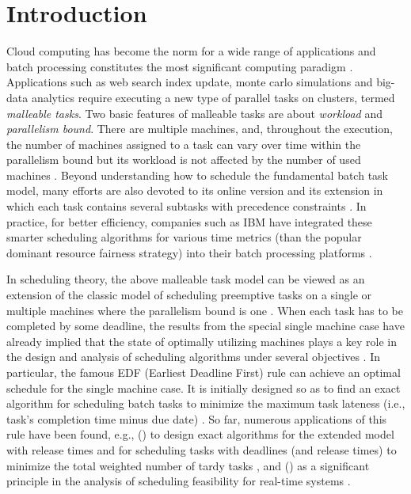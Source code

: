 \documentclass[10pt,journal,compsoc]{IEEEtran}
\newcommand{\rmnum}[1]{\romannumeral #1}
\begin{document}
\maketitle


\IEEEdisplaynontitleabstractindextext




\IEEEpeerreviewmaketitle




\section{Introduction}
\label{intro}


Cloud computing has become the norm for a wide range of applications and batch processing constitutes the most significant computing paradigm \cite{Hu}. Applications such as web search index update, monte carlo simulations and big-data analytics require executing a new type of parallel tasks on clusters, termed {\em malleable tasks}. Two basic features of malleable tasks are about {\em workload} and {\em parallelism bound}. There are multiple machines, and, throughout the execution, the number of machines assigned to a task can vary over time within the parallelism bound but its workload is not affected by the number of used machines \cite{Jain11a,Jain}. Beyond understanding how to schedule the fundamental batch task model, many efforts are also devoted to its online version \cite{Lucier,Azar,Jain14} and its extension in which each task contains several subtasks with precedence constraints \cite{Bodik,Nagarajan}. In practice, for better efficiency, companies such as IBM have integrated these smarter scheduling algorithms for various time metrics  \cite{Nagarajan} (than the popular dominant resource fairness strategy) into their batch processing platforms \cite{Wolf}.


In scheduling theory, the above malleable task model can be viewed as an extension of the classic model of scheduling preemptive tasks on a single or multiple machines where the parallelism bound is one \cite{Lawler91,Karger}.  When each task has to be completed by some deadline, the results from the special single machine case have already implied that the state of optimally utilizing machines plays a key role in the design and analysis of scheduling algorithms under several objectives \cite{Karger}. In particular, the famous EDF (Earliest Deadline First) rule can achieve an optimal schedule for the single machine case. It is initially designed so as to find an exact algorithm for scheduling batch tasks to minimize the maximum task lateness (i.e., task's completion time minus due date) \cite{Jac55}. So far, numerous applications of this rule have been found, e.g., (\rmnum{1}) to design exact algorithms for the extended model with release times \cite{Hor74} and for scheduling tasks with deadlines (and release times) to minimize the total weighted number of tardy tasks \cite{Lawler69}, and (\rmnum{2}) as a significant principle in the analysis of scheduling feasibility for real-time systems \cite{Stankovic98}.
\end{document}
